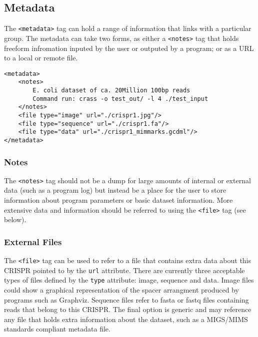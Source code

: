 \documentclass[11pt]{article} %
\begin{document}
\subsection{Metadata}
The \lstinline[language=XML_new]$<metadata>$ tag can hold a range of information that links with a particular group.  The metadata can take two forms, as either a \lstinline[language=XML_new]$<notes>$ tag that holds freeform infromation inputed by the user or outputed by a program; or as a URL to a local or remote file.
\begin{lstlisting}[language=XML_new]
<metadata>
	<notes>
		E. coli dataset of ca. 20Million 100bp reads
		Command run: crass -o test_out/ -l 4 ./test_input
	</notes>
	<file type="image" url="./crispr1.jpg"/>
	<file type="sequence" url="./crispr1.fa"/>
	<file type="data" url="./crispr1_mimmarks.gcdml"/>
</metadata>
\end{lstlisting}

\subsubsection{Notes}
The \lstinline[language=XML_new]$<notes>$ tag should not be a dump for large amounts of internal or external data (such as a program log) but instead be a place for the user to store information about program parameters or basic dataset information.  More extensive data and information should be referred to using the \lstinline[language=XML_new]$<file>$ tag (see below).

\subsubsection{External Files}
The \lstinline[language=XML_new]$<file>$ tag can be used to refer to a file that contains extra data about this CRISPR pointed to by the \lstinline[language=XML_new]$url$ attribute.  There are currently three acceptable types of files defined by the \lstinline[language=XML_new]$type$ attribute: image, sequence and data.  Image files could show a graphical representation of the spacer arrangment produced by programs such as Graphviz.  Sequence files refer to fasta or fastq files containing reads that belong to this CRISPR. The final option is generic and may reference any file that holds extra information about the dataset, such as a MIGS/MIMS standards compliant metadata file. 
\end{document}
